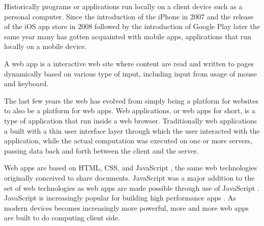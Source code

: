 Historically programs or applications run locally on a client device such as a personal computer. Since the introduction of the iPhone in 2007 and the release of the iOS app store in 2008 followed by the introduction of Google Play later the same year many %
has gotten acquainted with mobile apps, applications that run locally on a mobile device.

A web app is a interactive web site where content are read and written to pages dynamically based on various type of input, including input from usage of mouse and keyboard.

The last few years the web has evolved from simply being a platform for websites to also be a platform for web apps. Web applications, or web apps for short, is a type of application that run inside a web browser. Traditionally web applications a built with a thin user interface layer through which the user interacted with the application, while the actual computation was executed on one or more servers, %
passing data back and forth between the client and the server.

Web apps are based on HTML, CSS, and JavaScript \parencite{ParkJungMoon2015}, the same web technologies originally conceived to share documents. JavaScript was a major addition to the set of web technologies as web apps are made possible through use of JavaScript \parencite{ParkJungMoon2015}. JavaScript is increasingly popular for building high performance apps \parencite{SandhuHerreraHendren2018}. As modern devices becomes increasingly more powerful, more and more web apps are built to do computing client side.

\begin{comment}

\hl{TODO: reference }
Figure \ref{google-docs}
    
\begin{figure}[!h]
\centering
\texttt{[image: ../Figures/world-wide-web]}
\caption{The first web page created by Tim Berners-Lee.}
\label{world-wide-web}
\end{figure}

\begin{figure}[!h]
\centering
\texttt{[image: ../Figures/google-docs]}
\caption{Google Docs is a modern web application that enables users to run an office suite in a web browser.}
\label{google-docs}
\end{figure}

\end{comment}
